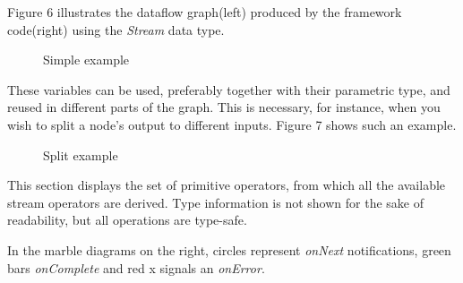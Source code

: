 \documentclass{dithesis}
\begin{document}
Figure 6 illustrates the dataflow graph(left) produced by the framework code(right) using the \textit{Stream} data type.

\begin{figure}[h!] 
	\begin{multicols}{2}
	\resizebox{0.5\textwidth}{!}{
			
	}
	\end{multicols}
	\caption{Simple example}
\end{figure}

These variables can be used, preferably together with their parametric type, and reused in different parts of the graph. This is necessary, for instance, when you wish to split a node's output to different inputs. Figure 7 shows such an example.

\begin{figure}[h!] 
	\begin{multicols}{2}
	\resizebox{0.5\textwidth}{!}{
			
	}
	\end{multicols}
	\caption{Split example}
\end{figure}

This section displays the set of primitive operators, from which all the available stream operators are derived. Type information is not shown for the sake of readability, but all operations are type-safe.

In the marble diagrams on the right, circles represent \textit{onNext} notifications, green bars \textit{onComplete} and red x signals an \textit{onError}.


\newcommand{\lll}{0.4\linewidth}
\newcommand{\rrr}{0.5\linewidth}
\end{document}
